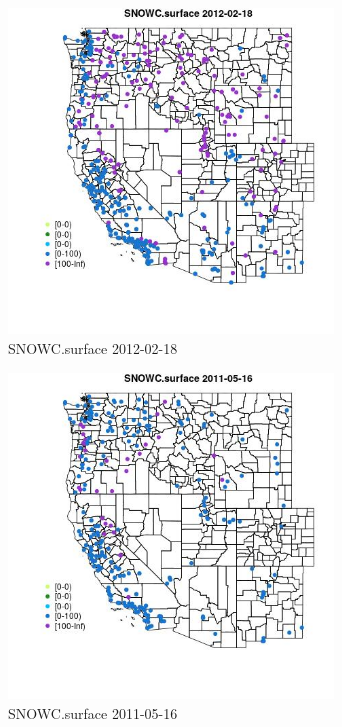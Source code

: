 \begin{figure} 
\centering  
\includegraphics[width=0.77\textwidth]{Code_Outputs/Report_ML_input_PM25_Step4_part_f_de_duplicated_aves_prioritize_24hr_obswNAs_MapObsSNOWCsurface2012-02-18.jpg} 
\caption{\label{fig:Report_ML_input_PM25_Step4_part_f_de_duplicated_aves_prioritize_24hr_obswNAsMapObsSNOWCsurface2012-02-18}SNOWC.surface 2012-02-18} 
\end{figure} 
 

\clearpage 

\begin{figure} 
\centering  
\includegraphics[width=0.77\textwidth]{Code_Outputs/Report_ML_input_PM25_Step4_part_f_de_duplicated_aves_prioritize_24hr_obswNAs_MapObsSNOWCsurface2011-05-16.jpg} 
\caption{\label{fig:Report_ML_input_PM25_Step4_part_f_de_duplicated_aves_prioritize_24hr_obswNAsMapObsSNOWCsurface2011-05-16}SNOWC.surface 2011-05-16} 
\end{figure} 
 

